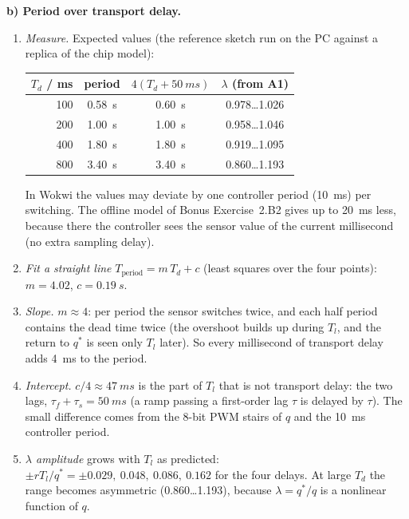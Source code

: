 \begin{solution}
\textbf{b) Period over transport delay.}
\begin{enumerate}[label=Step \arabic*:,leftmargin=*,itemsep=1pt]
  \item \emph{Measure.} Expected values (the reference sketch run on the PC
    against a replica of the chip model):
    \begin{center}
    \small
    \begin{tabular}{@{}rccc@{}}
    \toprule
    $T_d$ / ms & period & $4(T_d+\SI{50}{ms})$ & $\lambda$ (from A1) \\
    \midrule
    100 & \SI{0.58}{s} & \SI{0.60}{s} & 0.978\dots1.026 \\
    200 & \SI{1.00}{s} & \SI{1.00}{s} & 0.958\dots1.046 \\
    400 & \SI{1.80}{s} & \SI{1.80}{s} & 0.919\dots1.095 \\
    800 & \SI{3.40}{s} & \SI{3.40}{s} & 0.860\dots1.193 \\
    \bottomrule
    \end{tabular}
    \end{center}
    In Wokwi the values may deviate by one controller period (\SI{10}{ms}) per
    switching. The offline model of Bonus Exercise~2.B2 gives up to
    \SI{20}{ms} less, because there the controller sees the sensor value of
    the current millisecond (no extra sampling delay).
  \item \emph{Fit a straight line} $T_{\text{period}}=m\,T_d+c$ (least squares
    over the four points): $m=4.02$, $c=\SI{0.19}{s}$.
  \item \emph{Slope.} $m\approx4$: per period the sensor switches twice, and
    each half period contains the dead time twice (the overshoot builds up
    during $T_l$, and the return to $q^*$ is seen only $T_l$ later). So every
    millisecond of transport delay adds \SI{4}{ms} to the period.
  \item \emph{Intercept.} $c/4\approx\SI{47}{ms}$ is the part of $T_l$ that is
    not transport delay: the two lags, $\tau_f+\tau_s=\SI{50}{ms}$ (a ramp
    passing a first-order lag $\tau$ is delayed by $\tau$). The small
    difference comes from the 8-bit PWM stairs of $q$ and the
    \SI{10}{ms} controller period.
  \item \emph{$\lambda$ amplitude} grows with $T_l$ as predicted:
    $\pm rT_l/q^*=\pm0.029,\ 0.048,\ 0.086,\ 0.162$ for the four delays. At
    large $T_d$ the range becomes asymmetric (0.860\dots1.193), because
    $\lambda=q^*/q$ is a nonlinear function of $q$.
\end{enumerate}


\end{solution}
